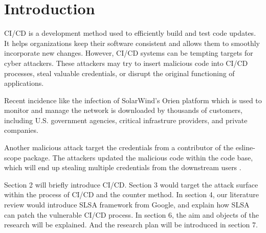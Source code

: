 \section{Introduction}
CI/CD is a development method used to efficiently build and test code updates. 
It helps organizations keep their software consistent and allows them to smoothly 
incorporate new changes. However, CI/CD systems can be tempting targets for cyber attackers. 
These attackers may try to insert malicious code into CI/CD processes, 
steal valuable credentials, or disrupt the original functioning of applications.

Recent incidence like the infection of SolarWind's Orien platform \cite{ladisa2023sok, 
peisert2021perspectives} which is used to monitor and manage the network is downloaded by 
thousands of customers, including U.S. government agencies, critical infrastrure providers, 
and private companies. 

Another malicious attack target the credentials from a contributor of the esline-scope package.
The attackers updated the malicious code within the code base, which will end up stealing
multiple credentials from the downstream users \cite{eslint2018}.

Section 2 will briefly introduce CI/CD. Section 3 would target the attack
surface within the process of CI/CD and the counter method. In section 4, our literature 
review would introduce SLSA framework from Google, and explain how SLSA can patch 
the vulnerable CI/CD process. In section 6, the aim and objects of the research 
will be explained. And the research plan will be introduced in section 7. 


